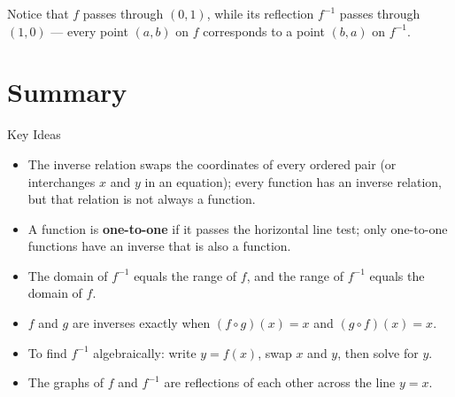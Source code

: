 \documentclass[12pt]{article}
\begin{document}
Notice that $f$ passes through $(0,1)$, while its reflection $f^{-1}$ passes through $(1,0)$ --- every point $(a,b)$ on $f$ corresponds to a point $(b,a)$ on $f^{-1}$.

\section*{Summary}

\begin{friendlyrule}{Key Ideas}
\begin{itemize}
    \item The inverse relation swaps the coordinates of every ordered pair (or interchanges $x$ and $y$ in an equation); every function has an inverse relation, but that relation is not always a function.
    \item A function is \textbf{one-to-one} if it passes the horizontal line test; only one-to-one functions have an inverse that is also a function.
    \item The domain of $f^{-1}$ equals the range of $f$, and the range of $f^{-1}$ equals the domain of $f$.
    \item $f$ and $g$ are inverses exactly when $(f\circ g)(x)=x$ and $(g\circ f)(x)=x$.
    \item To find $f^{-1}$ algebraically: write $y=f(x)$, swap $x$ and $y$, then solve for $y$.
    \item The graphs of $f$ and $f^{-1}$ are reflections of each other across the line $y=x$.
\end{itemize}
\end{friendlyrule}
\end{document}
